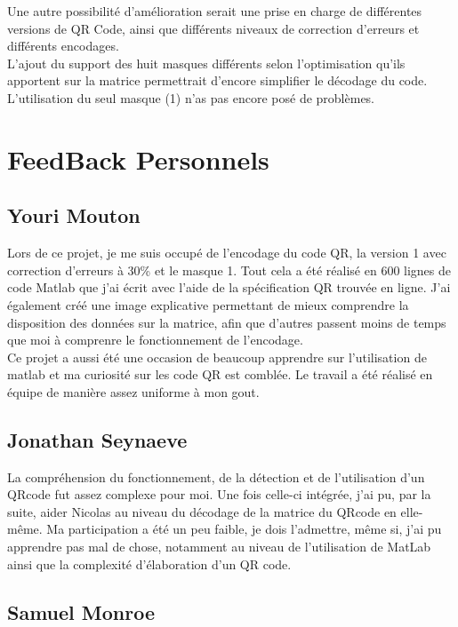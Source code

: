 \documentclass{report}
\begin{document}
		Une autre possibilité d'amélioration serait une prise en charge de différentes versions de QR Code, ainsi que différents niveaux de correction d'erreurs et différents encodages.\\
		
		L'ajout du support des huit masques différents selon l'optimisation qu'ils apportent sur la matrice permettrait d'encore simplifier le décodage du code. L'utilisation du seul masque (1) n'as pas encore posé de problèmes.

	\section{FeedBack Personnels}

		\subsection{Youri Mouton}
		
		    Lors de ce projet, je me suis occupé de l'encodage du code QR, la version 1 avec correction d'erreurs à 30\% et le masque 1. Tout cela  a été réalisé en 600 lignes de code Matlab que j'ai écrit avec l'aide de la spécification QR trouvée en ligne. J'ai également créé une image explicative permettant de mieux comprendre la disposition des données sur la matrice, afin que d'autres passent moins de temps que moi à comprenre le fonctionnement de l'encodage.\\
		    
		    Ce projet a aussi été une occasion de beaucoup apprendre sur l'utilisation de matlab et ma curiosité sur les code QR est comblée.  Le travail a été réalisé en équipe de manière assez uniforme à mon gout.\\

		\subsection{Jonathan Seynaeve}

			La compréhension du fonctionnement, de la détection et de l'utilisation d'un QRcode fut assez complexe pour moi. Une fois celle-ci intégrée, j'ai pu, par la suite, aider Nicolas au niveau du décodage de la matrice du QRcode en elle-même. Ma participation a été un peu faible, je dois l'admettre, même si, j'ai pu apprendre pas mal de chose, notamment au niveau de l'utilisation de MatLab ainsi que la complexité d'élaboration d'un QR code.\\
		
		\subsection{Samuel Monroe}
\end{document}
